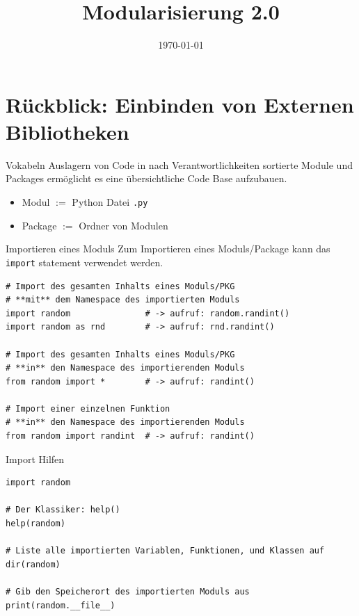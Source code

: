 



\title{Modularisierung 2.0}

\date{\today}




\maketitle

\section{Rückblick: Einbinden von Externen Bibliotheken}

\begin{frame}[fragile]{Vokabeln}
Auslagern von Code in nach Verantwortlichkeiten sortierte Module und Packages ermöglicht es eine übersichtliche Code Base aufzubauen.
\begin{itemize}
\item Modul $:=$ Python Datei \texttt{.py}
\item Package $:=$ \glqq Ordner \grqq von Modulen
\end{itemize}
\end{frame}

\begin{frame}[fragile]{Importieren eines Moduls}
    Zum Importieren eines Moduls/Package kann das \texttt{import} statement verwendet werden.
    \begin{lstlisting}
# Import des gesamten Inhalts eines Moduls/PKG
# **mit** dem Namespace des importierten Moduls
import random               # -> aufruf: random.randint()
import random as rnd        # -> aufruf: rnd.randint()

# Import des gesamten Inhalts eines Moduls/PKG
# **in** den Namespace des importierenden Moduls
from random import *        # -> aufruf: randint()

# Import einer einzelnen Funktion
# **in** den Namespace des importierenden Moduls
from random import randint  # -> aufruf: randint()
    \end{lstlisting}
\end{frame}

\begin{frame}[fragile]{Import Hilfen}

\begin{lstlisting}
import random

# Der Klassiker: help()
help(random)

# Liste alle importierten Variablen, Funktionen, und Klassen auf
dir(random)

# Gib den Speicherort des importierten Moduls aus
print(random.__file__)
\end{lstlisting}
\end{frame}

